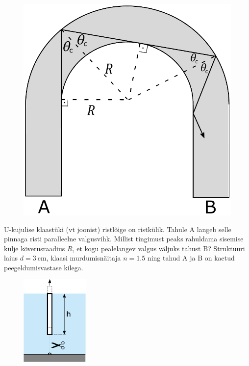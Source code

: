 \documentclass[10pt]{article}
\begin{document}

\begin{figure}
		\vspace{-10pt}
		\includegraphics[width=\linewidth]{2020-lahg-03-yl.pdf}
	\end{figure}
	U-kujulise klaastüki (vt joonist) ristlõige on ristkülik. Tahule A langeb selle pinnaga risti paralleelne valgusvihk.  Millist tingimust peaks rahuldama sisemise külje kõverusraadius $R$, et kogu pealelangev valgus väljuks tahust B? Struktuuri laius $d=\SI{3}{\cm}$, klaasi murdumisnäitaja $n=\num{1.5}$ ning tahud A ja B on kaetud peegeldumisvastase kilega.
\probend
\bigskip

\setAuthor{}

\begin{figure}
    \vspace{-30pt}
	\includegraphics[width=0.3\textwidth]{2020-v2g-03-yl.pdf}
\end{figure}
\end{document}
